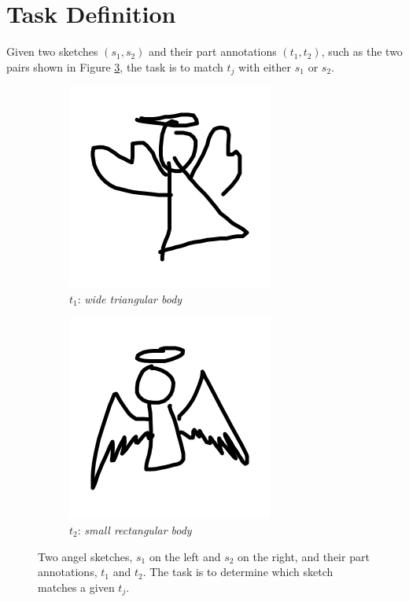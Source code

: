 \section{Task Definition} \label{modeling.task.def}
Given two sketches $(s_1,s_2)$ and their part annotations $(t_1,t_2)$, such as the two pairs shown in Figure \ref{modeling.task.sketches}, the task is to match $t_j$ with either $s_1$ or $s_2$.
\begin{figure}[!h]
\begin{subfigure}{0.5\textwidth}
    \centering
    \includegraphics[width=0.5\linewidth]{modeling/angel340.png}
    \caption{$t_1$: \textit{wide triangular body}}
    \label{modeling.task.sketches.1}  
\end{subfigure}
\begin{subfigure}{0.5\textwidth}
    \centering
    \includegraphics[width=0.5\linewidth]{modeling/angel389.png}   
    \caption{$t_2$: \textit{small rectangular body}}
    \label{modeling.task.sketches.2}  
\end{subfigure}
\caption{Two angel sketches, $s_1$ on the left and $s_2$ on the right, and their part annotations, $t_1$ and $t_2$. The task is to determine which sketch matches a given $t_j$.}
\label{modeling.task.sketches}
\end{figure}
